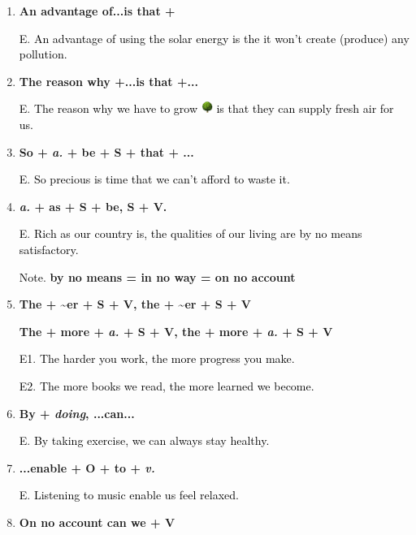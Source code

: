 \documentclass{article}
\begin{document}
\begin{enumerate}
\item \textbf{An advantage of...is that + }

  \textcolor{black}E. \textcolor{black}{An advantage of using the solar energy is the it
    won't create (produce) any pollution.}

\item \textbf{The reason why +...is that +...}

  \textcolor{black}E. \textcolor{black}{The reason why we have to grow}
  \includegraphics[height=1em]{tree1} \textcolor{black}{is that they can supply fresh air
    for us.}

\item \textbf{So + \emph{a.} + be + S + that + ...}
  
  \textcolor{black}E. \textcolor{black}{So precious is time that we can't afford to waste
it.}

\item \textbf{\emph{a.} + as + S + be, S + V.}

  \textcolor{black}E. \textcolor{black}{Rich as our country is, the qualities of our living
    are by no means satisfactory.}

  \textcolor{black}{Note}. \textbf{by no means = in no way = on no account}

\item \textbf{The + \textasciitilde{er} + S + V, the + \textasciitilde{er} + S + V}
  
  \textbf{The + more + \emph{a.} + S + V, the + more + \emph{a.} + S + V}

  \textcolor{black}{E1}. \textcolor{black}{The harder you work, the more progress you
    make.}

  \textcolor{black}{E2}. \textcolor{black}{The more books we read, the more learned we
    become.}

\item \textbf{By + \emph{doing}, ...can...}

  \textcolor{black}E. \textcolor{black}{By taking exercise, we can always stay healthy.}

\item \textbf{...enable + O + to + \emph{v.}}

  \textcolor{black}E. \textcolor{black}{Listening to music enable us feel relaxed.}

\item \textbf{On no account can we + V}


\end{enumerate}
\end{document}
